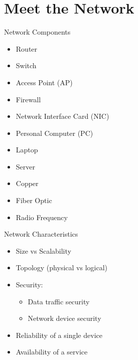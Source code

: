 \section[meet]{Meet the Network}

\begin{frame}{Network Components}
	\begin{itemize}[<2->]
		\item Router
		\item Switch
		\item Access Point (AP)
		\item Firewall
		\item Network Interface Card (NIC)
	\end{itemize}
	\begin{itemize}[<3->]
		\item Personal Computer (PC)
		\item Laptop
		\item Server
	\end{itemize}
	\begin{itemize}[<4->]
		\item Copper
		\item Fiber Optic
		\item Radio Frequency
	\end{itemize}
\end{frame}
\begin{frame}{Network Characteristics}
	\begin{itemize}[<+->]
		\item Size vs Scalability
		\item Topology (physical vs logical)
		\item Security:
		\begin{itemize}
			\item Data traffic security
			\item Network device security
		\end{itemize}
		\item Reliability of a single device
		\item Availability of a service
	\end{itemize}
\end{frame}
